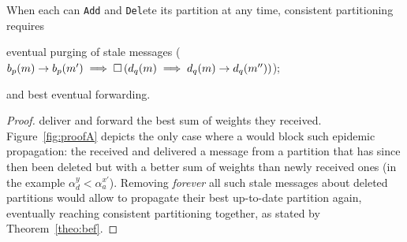 
\begin{corollary}
%
When each \process can \texttt{Add} and \texttt{Del}ete its partition
at any time, consistent partitioning requires
\begin{inparaenum}[(i)]
\item eventual purging of stale messages ($b_p(m) \rightarrow b_p(m')
  \implies \square\, (d_q(m) \implies d_q(m) \rightarrow
  d_q(m''))$);
\item and best eventual forwarding.
\end{inparaenum}
\end{corollary}

\begin{proof}
  \Processes deliver and forward the best sum of weights they
  received. Figure~\ref{fig:proofA} depicts the only case where a
  \process would block such epidemic propagation: the \process
  received and delivered a message from a partition that has since
  then been deleted but with a better sum of weights than newly
  received ones (in the example $\alpha_d^y <
  \alpha_a^{x'}$). Removing \emph{forever} all such stale messages
  about deleted partitions would allow \processes to propagate their
  best up-to-date partition again, eventually reaching consistent
  partitioning together, as stated by Theorem~\ref{theo:bef}.
\end{proof}




